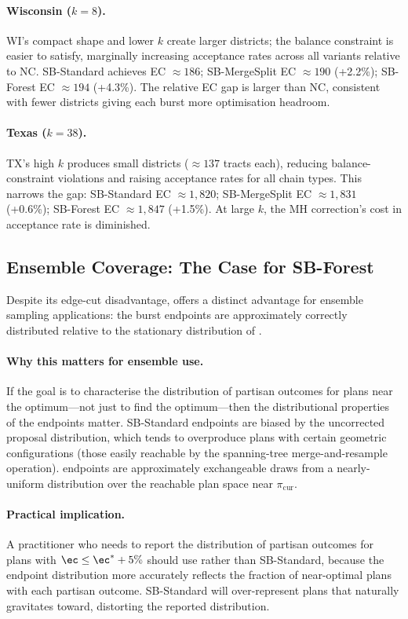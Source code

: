 \paragraph{Wisconsin ($k=8$).}
WI's compact shape and lower $k$ create larger districts; the balance
constraint is easier to satisfy, marginally increasing acceptance rates
across all variants relative to NC.
SB-Standard achieves EC $\approx 186$; SB-MergeSplit EC $\approx 190$ (+2.2\%);
SB-Forest EC $\approx 194$ (+4.3\%).
The relative EC gap is larger than NC, consistent with fewer districts
giving each burst more optimisation headroom.

\paragraph{Texas ($k=38$).}
TX's high $k$ produces small districts ($\approx 137$ tracts each),
reducing balance-constraint violations and raising acceptance rates for all
chain types.
This narrows the gap: SB-Standard EC $\approx 1{,}820$; SB-MergeSplit
EC $\approx 1{,}831$ (+0.6\%); SB-Forest EC $\approx 1{,}847$ (+1.5\%).
At large $k$, the MH correction's cost in acceptance rate is diminished.

\subsection{Ensemble Coverage: The Case for SB-Forest}

Despite its edge-cut disadvantage, \sbf{} offers a distinct advantage for
ensemble sampling applications: the burst endpoints are approximately
correctly distributed relative to the stationary distribution of
\frecom{}.

\paragraph{Why this matters for ensemble use.}
If the goal is to characterise the distribution of partisan outcomes for
plans near the optimum---not just to find the optimum---then the
distributional properties of the endpoints matter.
SB-Standard endpoints are biased by the uncorrected \recom{} proposal
distribution, which tends to overproduce plans with certain geometric
configurations (those easily reachable by the spanning-tree merge-and-resample
operation).
\sbf{} endpoints are approximately exchangeable draws from a nearly-uniform
distribution over the reachable plan space near $\pi_{\mathrm{cur}}$.

\paragraph{Practical implication.}
A practitioner who needs to report the distribution of partisan outcomes for
plans with $\ec \leq \ec^* + 5\%$ should use \sbf{} rather than SB-Standard,
because the \sbf{} endpoint distribution more accurately reflects the
fraction of near-optimal plans with each partisan outcome.
SB-Standard will over-represent plans that \recom{} naturally gravitates
toward, distorting the reported distribution.
